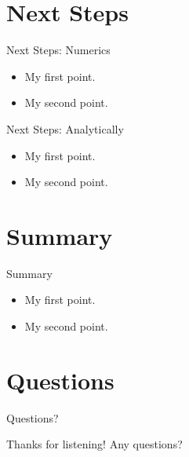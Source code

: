 \documentclass{beamer}
\begin{document}
\section{Next Steps}
\begin{frame}{Next Steps: Numerics}
	\begin{itemize}
		\item {
			My first point.
		}
		\item {
			My second point.
		}
	\end{itemize}
\end{frame}

\begin{frame}{Next Steps: Analytically}
	\begin{itemize}
		\item {
			My first point.
		}
		\item {
			My second point.
		}
	\end{itemize}
\end{frame}

\section*{Summary}
\begin{frame}{Summary}
	\begin{itemize}
		\item {
			My first point.
		}
		\item {
			My second point.
		}
	\end{itemize}
\end{frame}

\section*{Questions}
\begin{frame}{Questions?}
	\begin{center}
		Thanks for listening! Any questions?
	\end{center}
\end{frame}
\end{document}
